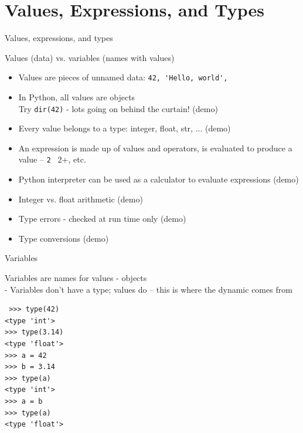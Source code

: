 \documentclass{beamer}
\begin{document}
\section{Values, Expressions, and Types}


\begin{frame}[fragile]{Values, expressions, and types}

Values (data) vs. variables (names with values)

\begin{itemize}
    \item  Values are pieces of unnamed data: \verb+42, 'Hello, world',+

    \item  In Python, all values are objects\\
      Try \verb+dir(42)+ - lots going on behind the curtain! (demo)

    \item  Every value belongs to a type: integer, float, str, ...  (demo)

    \item  An expression is made up of values and operators, is evaluated to
        produce a value -- \verb+2 + 2+, etc.

    \item  Python interpreter can be used as a calculator to evaluate expressions (demo)

    \item  Integer vs. float arithmetic (demo)

    \item  Type errors - checked at run time only (demo)
  
    \item  Type conversions (demo)
\end{itemize}

\end{frame}

\begin{frame}[fragile]{Variables}

{\large Variables are names for values - objects}\\[0.1in]
\hspace{0.5in} - Variables don’t have a type; values do -- 
this is where the dynamic comes from

\begin{verbatim}
￼>>> type(42)
<type 'int'>
>>> type(3.14)
<type 'float'>
>>> a = 42
>>> b = 3.14
>>> type(a)
<type 'int'>
>>> a = b
>>> type(a)
<type 'float'>
\end{verbatim}

\end{frame}
\end{document}
